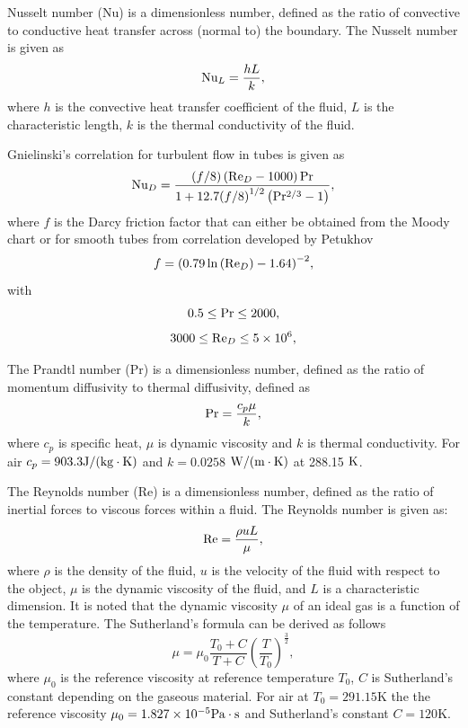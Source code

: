 \documentclass[preprint,5p,twocolumn,10pt,sort&compress]{elsarticle}
\begin{document}
Nusselt number (Nu) is a dimensionless number, defined as the ratio of convective to conductive heat transfer across (normal to) the boundary.
The Nusselt number is given as \cite{Bergman2017}
\begin{equation}
{\rm{N}}{{\rm{u}}_L} = \frac{{hL}}{k},
\end{equation}
where $h$ is the convective heat transfer coefficient of the fluid, $L$ is the characteristic length, $k$ is the thermal conductivity of the fluid.

Gnielinski's correlation for turbulent flow in tubes \cite{Gnielinski1975} is given as
\begin{equation}
{\rm{N}}{{\rm{u}}_D} = \frac{{\left( {f/8} \right)\left( {{\rm{R}}{{\rm{e}}_D} - 1000} \right){\rm{Pr}}}}{{1 + 12.7{{(f/8)}^{1/2}}\left( {{\rm{P}}{{\rm{r}}^{2/3}} - 1} \right)}},
\end{equation}
where $f$ is the Darcy friction factor that can either be obtained from the Moody chart or for smooth tubes from correlation developed by Petukhov \cite{Bergman2017} 
\begin{equation}
f = {\left( {0.79\ln \left( {{\rm{R}}{{\rm{e}}_D}} \right) - 1.64} \right)^{ - 2}},
\end{equation}
with
\begin{equation}
0.5 \le {\rm{Pr}} \le 2000,
\end{equation}
\begin{equation}
3000 \le {\rm{R}}{{\rm{e}}_D} \le 5 \times {10^6},
\end{equation}

The Prandtl number (Pr) is a dimensionless number, defined as the ratio of momentum diffusivity to thermal diffusivity, defined as
\begin{equation}
{\rm{Pr}} = \frac{{{c_p}\mu }}{k},
\end{equation}
where
$c_{p}$ is specific heat, $\mu$ is dynamic viscosity and $k$ is thermal conductivity. For air $c_{p}=903.3 {\rm{J/(kg}} \cdot {\rm{K}})$ and $k=0.0258$ ${\rm{W/(m}} \cdot {\rm{K}})$ at 288.15 ${\rm{K}}$.

The Reynolds number (Re) is a dimensionless number, defined as the ratio of inertial forces to viscous forces within a fluid.
The Reynolds number is given as:
\begin{equation}
{\rm{Re}} = \frac{{\rho uL}}{\mu },
\end{equation}
where
$\rho$ is the density of the fluid, $u$ is the velocity of the fluid with respect to the object, $\mu$ is the dynamic viscosity of the fluid, and $L$ is a characteristic dimension.
It is noted that the dynamic viscosity $\mu$ of an ideal gas is a function of the temperature. The Sutherland's formula can be derived as follows
\begin{equation}
\mu  = {\mu _0}\frac{{{T_0} + C}}{{T + C}}{\left( {\frac{T}{{{T_0}}}} \right)^{\frac{3}{2}}},
\end{equation}
where 
$\mu_0$ is the reference viscosity at reference temperature $T_0$,
$C$ is Sutherland's constant depending on the gaseous material. For air at $T_0=291.15 $K the the reference viscosity $\mu_0=1.827\times 10^{-5} \rm{Pa\cdot s}$ and Sutherland's constant $C=120$K.
\end{document}
